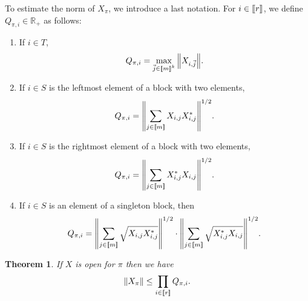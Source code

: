 \documentclass[11pt]{article}
\newtheorem{theorem}[lemma]{Theorem}
\newcommand{\dR}{\mathbb {R}}
\newcommand{\NRM}[1]{{{\left\| #1\right\|}}} %
\newcommand{\1}{1\!\!{\sf I}}
\newcommand{\INT}[1]{{{\left[\hspace{-1.4pt}\left[#1\right]\hspace{-1.4pt}\right]}}}
\begin{document}
To estimate the norm of $X_{\pi}$, we introduce a last notation. 
For $i\in \INT{r}$, we define $Q_{\pi,i} \in \dR_+$ as follows:
\begin{enumerate}
\item If $i \in T $,
$$Q_{\pi,i}=\max_{\vec j\in \INT{m}^k} \NRM{ X_{i,\vec j}}.$$
\item If $i \in S$ is the leftmost element of a block with two elements, 
$$Q_{\pi,i}=\NRM{ \sum_{j\in \INT{m}} X_{i,j}X_{i,j}^*}^{1/2}.$$
\item If $i \in S$ is the rightmost element of a block with two elements, 
$$Q_{\pi,i}=\NRM{ \sum_{j\in \INT{m}} X_{i,j}^*X_{i,j}}^{1/2}.$$

\item If $i \in S$ is an element of a singleton block, then 
$$Q_{\pi,i}= \NRM{\sum_{j\in \INT{m}} \sqrt{X_{i,j}X_{i,j}^*} }^{1/2} \cdot\NRM{\sum_{j\in \INT{m}} \sqrt{X_{i,j}^*X_{i,j}} }^{1/2}.$$
\end{enumerate}


\begin{theorem}\label{th:NCCS}
If $X$ is open for $\pi$ then we have 
$$
\NRM{X_{\pi}} \le \prod_{i\in \INT{r}} Q_{\pi,i}.
$$
\end{theorem}
\end{document}
